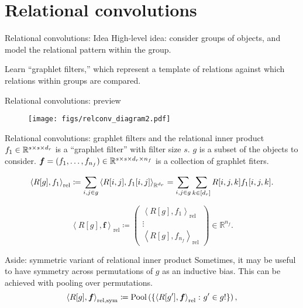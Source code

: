 \documentclass{beamer}
\newcommand{\reliprod}[2]{\left\langle #1, #2 \right\rangle_\mathrm{rel}}
\begin{document}
\section{Relational convolutions}
\begin{frame}{Relational convolutions: Idea}
  High-level idea: consider groups of objects, and model the relational pattern within the group.

  Learn ``graphlet filters,'' which represent a template of relations against which relations within groups are compared.
\end{frame}


\begin{frame}{Relational convolutions: preview}
  \begin{figure}
    \centering
    \texttt{[image: figs/relconv\_diagram2.pdf]}
  \end{figure}
\end{frame}

\begin{frame}{Relational convolutions: graphlet filters and the relational inner product}
  $f_1 \in \mathbb{R}^{s \times s \times d_r}$ is a ``graphlet filter'' with filter size $s$. $g$ is a subset of the objects to consider. $\bm{f} = (f_1, \ldots, f_{n_f}) \in \mathbb{R}^{s \times s \times d_r \times n_f}$ is a collection of graphlet fiters.

  \begin{equation*}%
    \reliprod{R[g]}{f_1} \coloneqq \sum_{i,j \in g} \iprod{R[i,j]}{f_1[i,j]}_{\reals^{d_r}} = \sum_{i,j \in g} \sum_{k \in [d_r]} R[i,j,k] f_1[i,j,k].
  \end{equation*}

  \begin{equation*}
    \reliprod{R[g]}{\bm{f}} \coloneq \begin{pmatrix} \reliprod{R[g]}{f_1} \\ \vdots 
    \\ \reliprod{R[g]}{f_{n_f}} \end{pmatrix} \in \mathbb{R}^{n_f}.
  \end{equation*}
\end{frame}

\begin{frame}{Aside: symmetric variant of relational inner product}
  Sometimes, it may be useful to have symmetry across permutations of $g$ as an inductive bias. This can be achieved with pooling over permutations.
  \begin{equation*}%
    \iprod{R[g]}{\bm{f}}_{\mathrm{rel}, \mathrm{sym}} \coloneq \mathrm{Pool}\paren{\set{\reliprod{R[g']}{\bm{f}} \colon g' \in g!}},
  \end{equation*}
\end{frame}
\end{document}
